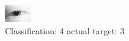 \begin{figure}[h!]
\begin{center}
\includegraphics[width=0.60\columnwidth]{figures/ID153_class_4_target_3.png}
\end{center}
\caption{ Classification: 4 actual target: 3}
\label{fig:ID153_class_4_target_3}
\end{figure}
